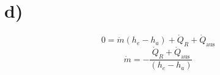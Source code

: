 

\section*{d)}
\begin{equation*}
0 = \dot{m}(h_e - h_a) + \dot{Q}_R + \dot{Q}_{\text{aus}}
\end{equation*}
\begin{equation*}
\dot{m} = -\frac{\dot{Q}_R + \dot{Q}_{\text{aus}}}{(h_e - h_a)}
\end{equation*}